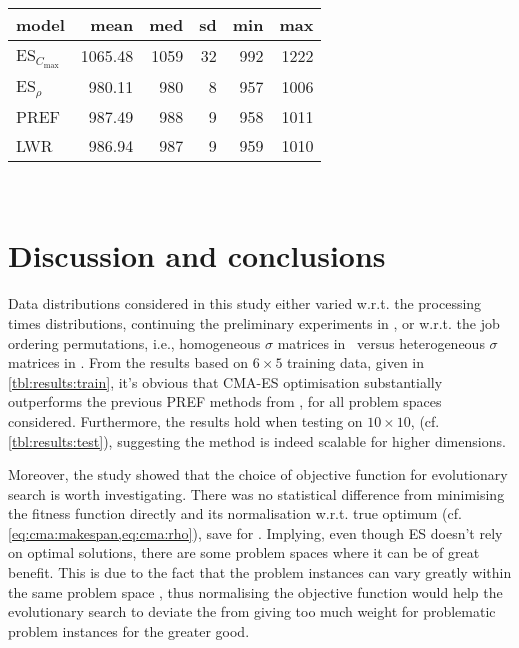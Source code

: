 \begin{table}[b!]
{\begin{tabular}{lrrrrr} \toprule
model&mean & med & sd & min & max \\   \midrule
ES$_{C_{\max}}$& 1065.48 & 1059 & 32 & 992 & 1222   \\ %
ES$_\rho$& 980.11 & 980 &  8 & 957 & 1006   \\ %
PREF&  987.49 & 988 &  9 & 958 & 1011  \\ %
LWR &  986.94 & 987 &  9 & 959 & 1010   \\ %
\bottomrule \end{tabular}}
\\

\end{table}

\section{Discussion and conclusions}\label{sec:disc}
Data distributions considered in this study either varied 
w.r.t. the processing times distributions, continuing the preliminary experiments in  \cite{InRu11a} , or 
w.r.t. the job ordering permutations, i.e., homogeneous $\sigma$ matrices in \FSP\ versus heterogeneous $\sigma$ matrices in \JSP . 
From the results based on $6\times5$ training data, given  in \cref{tbl:results:train}, it's obvious that CMA-ES optimisation substantially outperforms the previous PREF methods from \cite{InRu11a}, for all problem spaces considered. Furthermore, the results hold when testing on $10\times10$, (cf. \cref{tbl:results:test}), suggesting the method is indeed  scalable for higher dimensions. 

Moreover, the study showed that the choice of objective function  for evolutionary search is worth investigating. There was no statistical difference from minimising the fitness function directly and its normalisation w.r.t. true optimum (cf. \cref{eq:cma:makespan,eq:cma:rho}), save for . Implying, even though ES doesn't rely on optimal solutions, there are some problem spaces where it can be of great benefit. This is due to the fact that the problem instances can vary greatly within the same problem space \cite{InRu12}, thus normalising the objective function would help the evolutionary search to deviate the from giving too much weight for problematic problem instances for the greater good.

